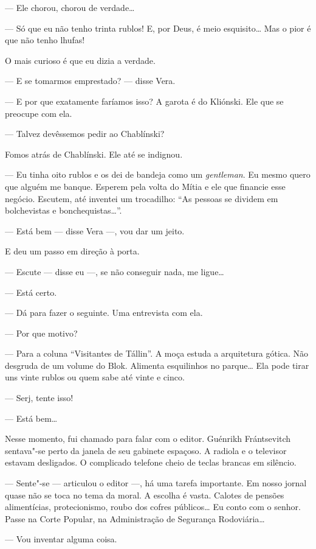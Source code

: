 --- Ele chorou, chorou de verdade\ldots{}

--- Só que eu não tenho trinta rublos! E, por Deus, é meio esquisito\ldots{}
Mas o pior é que não tenho lhufas!

O mais curioso é que eu dizia a verdade.

--- E se tomarmos emprestado? --- disse Vera.

--- E por que exatamente faríamos isso? A garota é do Kliónski. Ele que
se preocupe com ela.

--- Talvez devêssemos pedir ao Chablínski?

Fomos atrás de Chablínski. Ele até se indignou.

--- Eu tinha oito rublos e os dei de bandeja como um \emph{gentleman}.
Eu mesmo quero que alguém me banque. Esperem pela volta do Mítia e ele
que financie esse negócio. Escutem, até inventei um trocadilho: ``As
pessoas se dividem em bolchevistas e bonchequistas\ldots{}''.

--- Está bem --- disse Vera ---, vou dar um jeito.

E deu um passo em direção à porta.

--- Escute --- disse eu ---, se não conseguir nada, me ligue\ldots{}

--- Está certo.

--- Dá para fazer o seguinte. Uma entrevista com ela.

--- Por que motivo?

--- Para a coluna ``Visitantes de Tállin''. A moça estuda a arquitetura
gótica. Não desgruda de um volume do Blok. Alimenta esquilinhos no
parque\ldots{} Ela pode tirar uns vinte rublos ou quem sabe até vinte e
cinco.

--- Serj, tente isso!

--- Está bem\ldots{}

Nesse momento, fui chamado para falar com o editor. Guénrikh
Frántsevitch sentava"-se perto da janela de seu gabinete espaçoso. A
radiola e o televisor estavam desligados. O complicado telefone cheio de
teclas brancas em silêncio.

--- Sente"-se --- articulou o editor ---, há uma tarefa importante. Em
nosso jornal quase não se toca no tema da moral. A escolha é vasta.
Calotes de pensões alimentícias, protecionismo, roubo dos cofres
públicos\ldots{} Eu conto com o senhor. Passe na Corte Popular, na
Administração de Segurança Rodoviária\ldots{}

--- Vou inventar alguma coisa.

